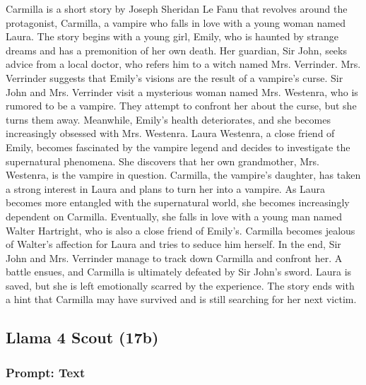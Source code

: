 \documentclass{article} %
\begin{document}
\textcolor{skipred}{Carmilla is a short story by Joseph Sheridan Le Fanu that revolves around the protagonist, Carmilla, a vampire who falls in love with a young woman named Laura.} The story begins with a young girl, Emily, who is haunted by strange dreams and has a premonition of her own death. \textcolor{skipred}{Her guardian, Sir John, seeks advice from a local doctor, who refers him to a witch named Mrs. Verrinder. Mrs. Verrinder suggests that Emily's visions are the result of a vampire's curse. Sir John and Mrs. Verrinder visit a mysterious woman named Mrs. Westenra, who is rumored to be a vampire. They attempt to confront her about the curse, but she turns them away. Meanwhile, Emily's health deteriorates, and she becomes increasingly obsessed with Mrs. Westenra. Laura Westenra, a close friend of Emily, becomes fascinated by the vampire legend and decides to investigate the supernatural phenomena. She discovers that her own grandmother, Mrs. Westenra, is the vampire in question. Carmilla, the vampire's daughter, has taken a strong interest in Laura and plans to turn her into a vampire. As Laura becomes more entangled with the supernatural world, she becomes increasingly dependent on Carmilla. Eventually, she falls in love with a young man named Walter Hartright, who is also a close friend of Emily's. Carmilla becomes jealous of Walter's affection for Laura and tries to seduce him herself.} In the end, Sir John and Mrs. Verrinder manage to track down Carmilla and confront her. \textcolor{skipred}{A battle ensues, and Carmilla is ultimately defeated by Sir John's sword. Laura is saved, but she is left emotionally scarred by the experience.} The story ends with a hint that Carmilla may have survived and is still searching for her next victim.

\subsection{Llama 4 Scout (17b)}

\subsubsection{Prompt: Text}
\end{document}
